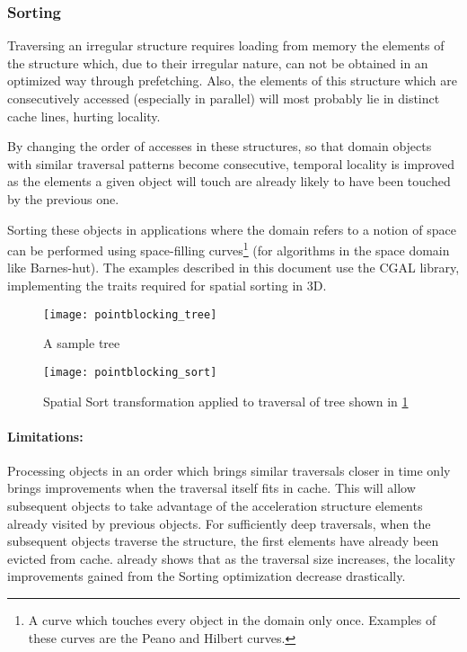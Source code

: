 \subsubsection{Sorting}
\label{sec:optim:sort}

Traversing an irregular structure requires loading from memory the elements of the structure which, due to their irregular nature, can not be obtained in an optimized way through prefetching. Also, the elements of this structure which are consecutively accessed (especially in parallel) will most probably lie in distinct cache lines, hurting locality.

By changing the order of accesses in these structures, so that domain objects with similar traversal patterns become consecutive, temporal locality is improved as the elements a given object will touch are already likely to have been touched by the previous one.

Sorting these objects in applications where the domain refers to a notion of space can be performed using space-filling curves\footnote{A curve which touches every object in the domain only once. Examples of these curves are the Peano and Hilbert curves.} (for algorithms in the space domain like Barnes-hut). The examples described in this document use the CGAL library, implementing the traits required for spatial sorting in 3D.

\begin{figure}[!htp]
	\centering
	\texttt{[image: pointblocking\_tree]}
	\caption{A sample tree}
	\label{fig:tree}
\end{figure}

\begin{figure}[!htp]
	\centering
	\texttt{[image: pointblocking\_sort]}
	\caption{Spatial Sort transformation applied to traversal of tree shown in \cref{fig:tree}}
	\label{fig:sort}
\end{figure}

\paragraph{Limitations:}
Processing objects in an order which brings similar traversals closer in time only brings improvements when the traversal itself fits in cache. This will allow subsequent objects to take advantage of the acceleration structure elements already visited by previous objects. For sufficiently deep traversals, when the subsequent objects traverse the structure, the first elements have already been evicted from cache. \cite{tree_tiler} already shows that as the traversal size increases, the locality improvements gained from the Sorting optimization decrease drastically.
